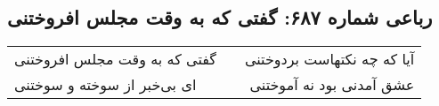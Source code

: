\begin{center}
\section*{رباعی شماره ۶۸۷: گفتی که به وقت مجلس افروختنی}
\label{sec:sh687}
\begin{longtable}{l p{0.5cm} r}
گفتی که به وقت مجلس افروختنی
&&
آیا که چه نکتهاست بردوختنی
\\
ای بی‌خبر از سوخته و سوختنی
&&
عشق آمدنی بود نه آموختنی
\\
\end{longtable}
\end{center}
